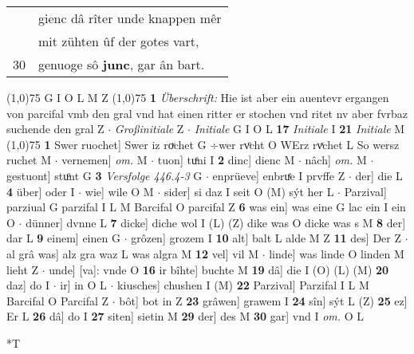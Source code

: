 \documentclass[8pt,a4paper,notitlepage]{article}
\begin{document}
\begin{table}[ht]
\begin{minipage}[t]{0.5\linewidth}
\begin{tabular}{rl}
 & gienc dâ rîter unde knappen mêr\\ 
 & mit zühten ûf der gotes vart,\\ 
30 & genuoge sô \textbf{junc}, gar ân bart.\\ 
\end{tabular}
\scriptsize
\line(1,0){75} \newline
G I O L M Z \newline
\line(1,0){75} \newline
\textbf{1} \textit{Überschrift:} Hie ist aber ein auentevr ergangen von parcifal vmb den gral vnd hat einen ritter er stochen vnd ritet nv aber fvrbaz suchende den gral Z   $\cdot$ \textit{Großinitiale} Z   $\cdot$ \textit{Initiale} G I O L  \textbf{17} \textit{Initiale} I  \textbf{21} \textit{Initiale} M  \newline
\line(1,0){75} \newline
\textbf{1} Swer ruochet] Swer iz roͮchet G ÷wer rvͦcht O WErz rvͯchet L So wersz ruchet M  $\cdot$ vernemen] \textit{om.} M  $\cdot$ tuon] tuͤni I \textbf{2} dinc] dienc M  $\cdot$ nâch] \textit{om.} M  $\cdot$ gestuont] stuͦnt G \textbf{3} \textit{Versfolge 446.4-3} G   $\cdot$ enprüeve] enbruͤe I prvffe Z  $\cdot$ der] die L \textbf{4} über] oder I  $\cdot$ wie] wile O M  $\cdot$ sider] si daz I seit O (M) sýt her L  $\cdot$ Parzival] parziual G parzifal I L M Barcifal O parcifal Z \textbf{6} was ein] was eine G lac ein I ein O  $\cdot$ dünner] dvnne L \textbf{7} dicke] diche wol I (L) (Z) dike was O dicke was s M \textbf{8} der] dar L \textbf{9} einem] einen G  $\cdot$ grôzen] grozem I \textbf{10} alt] balt L alde M Z \textbf{11} des] Der Z  $\cdot$ al grâ was] alz gra waz L was algra M \textbf{12} vel] vil M  $\cdot$ linde] was linde O linden M lieht Z  $\cdot$ unde] [va]: vnde O \textbf{16} ir bîhte] buchte M \textbf{19} dâ] die I (O) (L) (M) \textbf{20} daz] do I  $\cdot$ ir] in O L  $\cdot$ kiusches] chushen I (M) \textbf{22} Parzival] Parzifal I L M Barcifal O Parcifal Z  $\cdot$ bôt] bot in Z \textbf{23} grâwen] grawem I \textbf{24} sîn] sýt L (Z) \textbf{25} ez] Er L \textbf{26} dâ] do I \textbf{27} siten] sietin M \textbf{29} der] des M \textbf{30} gar] vnd I \textit{om.} O L \newline
\end{minipage}
\hspace{0.5cm}
\begin{minipage}[t]{0.5\linewidth}
\small
\begin{center}*T
\end{center}
\begin{tabular}{rl}

\end{tabular}
\end{minipage}
\end{table}
\end{document}
